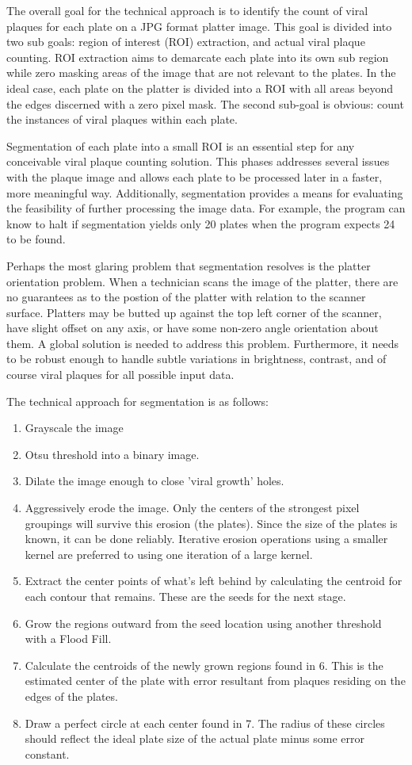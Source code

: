 \documentclass[12pt,final,onecolumn]{IEEEtran}
\begin{document}
The overall goal for the technical approach is to identify the count of viral plaques for each plate on a JPG format platter image. This goal is divided into two sub goals: region of interest (ROI) extraction, and actual viral plaque counting. ROI extraction aims to demarcate each plate into its own sub region while zero masking areas of the image that are not relevant to the plates.  In the ideal case, each plate on the platter is divided into a ROI with all areas beyond the edges discerned with a zero pixel mask. The second sub-goal is obvious: count the instances of viral plaques within each plate.

Segmentation of each plate into a small ROI is an essential step for any conceivable viral plaque counting solution. This phases addresses several issues with the plaque image and allows each plate to be processed later in a faster, more meaningful way. Additionally, segmentation provides a means for evaluating the feasibility of further processing the image data. For example, the program can know to halt if segmentation yields only 20 plates when the program expects 24 to be found.

Perhaps the most glaring problem that segmentation resolves is the platter orientation problem. When a technician scans the image of the platter, there are no guarantees as to the postion of the platter with relation to the scanner surface. Platters may be butted up against the top left corner of the scanner, have slight offset on any axis, or have some non-zero angle orientation about them. A global solution is needed to address this problem. Furthermore, it needs to be robust enough to handle subtle variations in brightness, contrast, and of course viral plaques for all possible input data. 

The technical approach for segmentation is as follows:
\begin{enumerate}
\item Grayscale the image
\item Otsu threshold into a binary image. 
\item Dilate the image enough to close 'viral growth' holes.
\item Aggressively erode the image. Only the centers of the strongest pixel groupings will survive this erosion (the plates). Since the size of the plates is known, it can be done reliably. Iterative erosion operations using a smaller kernel are preferred to using one iteration of a large kernel.
\item Extract the center points of what's left behind by calculating the centroid for each contour that remains. These are the seeds for the next stage.
\item Grow the regions outward from the seed location using another threshold with a Flood Fill. 
\item  Calculate the centroids of the newly grown regions found in 6. This is the estimated center of the plate with error resultant from plaques residing on the edges of the plates. 
\item  Draw a perfect circle at each center found in 7. The radius of these circles should reflect the ideal plate size of the actual plate minus some error constant.
\end{enumerate}
\end{document}
